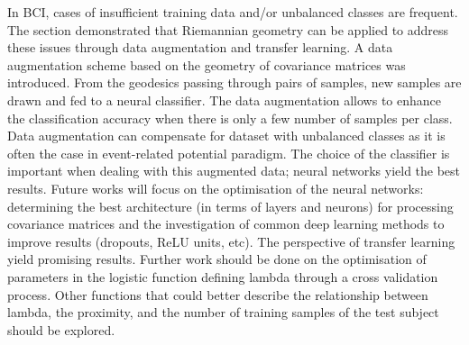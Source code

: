 In BCI, cases of insufficient training data and/or unbalanced classes are frequent.
The section demonstrated that Riemannian geometry can be applied to address these issues through data augmentation and transfer learning.
A data augmentation scheme based on the geometry of covariance matrices was introduced.
From the geodesics passing through pairs of samples, new samples are drawn and fed to a neural classifier. 
The data augmentation allows to enhance the classification accuracy when there is only a few number of samples per class.
Data augmentation can compensate for dataset with unbalanced classes as it is often the case in event-related potential paradigm.
The choice of the classifier is important when dealing with this augmented data; neural networks yield the best results.
Future works will focus on the optimisation of the neural networks: determining the best architecture (in terms of layers and neurons) for processing covariance matrices and the investigation of common deep learning methods to improve results (dropouts, ReLU units, etc).
The perspective of transfer learning yield promising results. 
Further work should be done on the optimisation of parameters in the logistic function defining lambda through a cross validation process.
Other functions that could better describe the relationship between lambda, the proximity, and the number of training samples of the test subject should be explored.  

 
 

